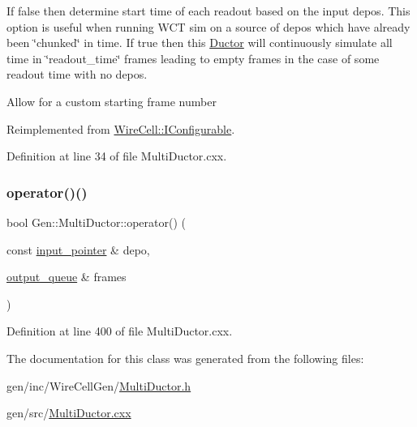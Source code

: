 If false then determine start time of each readout based on the input depos. This option is useful when running W\+CT sim on a source of depos which have already been \char`\"{}chunked\char`\"{} in time. If true then this \hyperlink{class_wire_cell_1_1_gen_1_1_ductor}{Ductor} will continuously simulate all time in \char`\"{}readout\+\_\+time\char`\"{} frames leading to empty frames in the case of some readout time with no depos.

Allow for a custom starting frame number 

Reimplemented from \hyperlink{class_wire_cell_1_1_i_configurable_a54841b2da3d1ea02189478bff96f7998}{Wire\+Cell\+::\+I\+Configurable}.



Definition at line 34 of file Multi\+Ductor.\+cxx.

\mbox{\label{class_wire_cell_1_1_gen_1_1_multi_ductor_ae3b9c4338fd2902bce0a1adb418f7a2e}} 
\subsubsection{\texorpdfstring{operator()()}{operator()()}}
{\footnotesize\ttfamily bool Gen\+::\+Multi\+Ductor\+::operator() (\begin{DoxyParamCaption}\item[{const \hyperlink{class_wire_cell_1_1_i_queuedout_node_acf5f716a764553f3c7055a9cf67e906e}{input\+\_\+pointer} \&}]{depo,  }\item[{\hyperlink{class_wire_cell_1_1_i_queuedout_node_a39018e4e3dd886befac9636ac791a685}{output\+\_\+queue} \&}]{frames }\end{DoxyParamCaption})\hspace{0.3cm}{\ttfamily [virtual]}}



Definition at line 400 of file Multi\+Ductor.\+cxx.



The documentation for this class was generated from the following files\+:\begin{DoxyCompactItemize}
\item 
gen/inc/\+Wire\+Cell\+Gen/\hyperlink{_multi_ductor_8h}{Multi\+Ductor.\+h}\item 
gen/src/\hyperlink{_multi_ductor_8cxx}{Multi\+Ductor.\+cxx}\end{DoxyCompactItemize}
